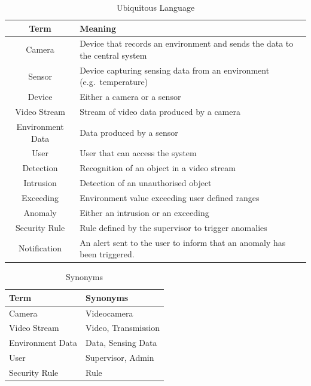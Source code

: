 \documentclass{scrartcl}
\begin{document}
    \renewcommand{\arraystretch}{1.5}
    \begin{table}
        \centering
        \begin{tabularx}{0.7\textwidth}{ | c | >{\centering\arraybackslash}X | }
            \hline
            \textbf{Term} & \textbf{Meaning} \\
            \hline
            Camera & Device that records an environment and sends the data to the central system \\
            \hline
            Sensor & Device capturing sensing data from an environment (e.g.\ temperature) \\
            \hline
            Device & Either a camera or a sensor \\
            \hline
            Video Stream & Stream of video data produced by a camera \\
            \hline
            Environment Data & Data produced by a sensor \\
            \hline
            User & User that can access the system \\
            \hline
            Detection & Recognition of an object in a video stream \\
            \hline
            Intrusion & Detection of an unauthorised object \\
            \hline
            Exceeding & Environment value exceeding user defined ranges \\
            \hline
            Anomaly & Either an intrusion or an exceeding \\
            \hline
            Security Rule & Rule defined by the supervisor to trigger anomalies \\
            \hline
            Notification & An alert sent to the user to inform that an anomaly has been triggered. \\
            \hline
        \end{tabularx}
        \caption{Ubiquitous Language}
        \label{tab:ubiquitous-language}
    \end{table}

    \renewcommand{\arraystretch}{1.8}
    \begin{table}
        \centering
        \begin{tabularx}{0.6\textwidth}{ | >{\centering\arraybackslash}X | >{\centering\arraybackslash}X | }
            \hline
            \textbf{Term} & \textbf{Synonyms} \\
            \hline
            Camera & Videocamera \\
            \hline
            Video Stream & Video, Transmission \\
            \hline
            Environment Data & Data, Sensing Data \\
            \hline
            User & Supervisor, Admin \\
            \hline
            Security Rule & Rule \\
            \hline
        \end{tabularx}
        \caption{Synonyms}
        \label{tab:synonyms}
    \end{table}
\end{document}

